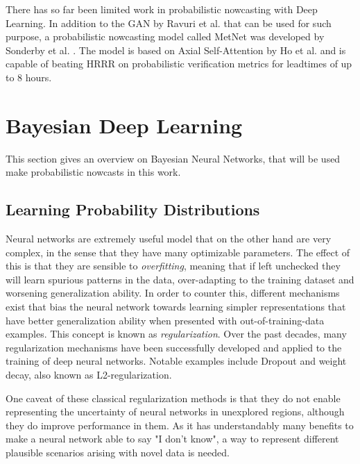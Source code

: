There has so far been limited work in probabilistic nowcasting with Deep Learning. In addition to the GAN by Ravuri et al. that can be used for such purpose, a probabilistic nowcasting model called MetNet was developed by Sonderby et al. \cite{sonderby_metnet_2020}. The model is based on Axial Self-Attention by Ho et al. \cite{ho_axial_2019} and is capable of beating HRRR on probabilistic verification metrics for leadtimes of up to 8 hours. 
 
\section{Bayesian Deep Learning}

This section gives an overview on Bayesian Neural Networks, that will be used make probabilistic nowcasts in this work.

\subsection{Learning Probability Distributions}

	Neural networks are extremely useful model that on the other hand are very complex, in the sense that they have many optimizable parameters. The effect of this is that they are sensible to \textit{overfitting}, meaning that if left unchecked they will learn spurious patterns in the data, over-adapting to the training dataset and worsening generalization ability. In order to counter this, different mechanisms exist that bias the neural network towards learning simpler representations that have better generalization ability when presented with out-of-training-data examples. This concept is known as \textit{regularization}. Over the past decades, many regularization mechanisms have been successfully developed and applied to the training of deep neural networks. Notable examples include Dropout and weight decay, also known as L2-regularization.  
	
	One caveat of these classical regularization methods is that they do not enable representing the uncertainty of neural networks in unexplored regions, although they do improve performance in them. As it has understandably many benefits to make a neural network able to say "I don't know", a way to represent different plausible scenarios arising with novel data is needed. 
	
